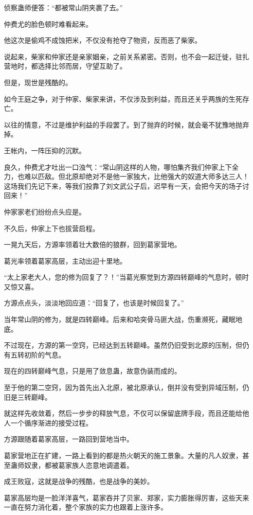 \begin{this_body}
侦察蛊师便答：“都被常山阴夹裹了去。”

仲费尤的脸色顿时难看起来。

他这次是偷鸡不成蚀把米，不仅没有抢夺了物资，反而恶了柴家。

说起来，柴家和仲家还是亲家姻亲，之前关系紧密。否则，也不会一起迁徙，驻扎营地时，都选择比邻而居，守望互助了。

但是，现世是残酷的。

如今王庭之争，对于仲家、柴家来讲，不仅涉及到利益，而且还关乎两族的生死存亡。

以往的情意，不过是维护利益的手段罢了。到了抛弃的时候，就会毫不犹豫地抛弃掉。

王帐内，一阵压抑的沉默。

良久，仲费尤才吐出一口浊气：“常山阴这样的人物，哪怕集齐我们仲家上下全力，也难以匹敌。但北原却绝对不是他一家独大，比他强大的奴道大师多达三人！这场我们先记下来，等我们投靠了刘文武公子后，迟早有一天，会把今天的场子讨回来！”

仲家家老们纷纷点头应是。

不久后，仲家上下也拔营启程。

一晃九天后，方源率领着壮大数倍的狼群，回到葛家营地。

葛光率领着葛家高层，主动出迎十里地。

“太上家老大人，您的修为回复了？！”当葛光察觉到方源四转巅峰的气息时，顿时又惊又喜。

方源点点头，淡淡地回应道：“回复了，也该是时候回复了。”

当年常山阴的修为，就是四转巅峰。后来和哈突骨马匪大战，伤重濒死，藏眠地底。

不过现在，方源的第一空窍，已经达到五转巅峰。虽然仍旧受到北原的压制，但仍有五转初阶的气息。

现在的四转巅峰气息，只是用了敛息蛊，故意伪装而成的。

至于他的第二空窍，因为首先出入北原，被北原承认，倒并没有受到异域压制，仍旧是三转巅峰。

就这样先收敛着，然后一步步的释放气息，不仅可以保留底牌手段，而且还能给他人一个循序渐进的接受过程。

方源跟随着葛家高层，一路回到营地当中。

葛家营地正在扩建，一路上看到的都是热火朝天的施工景象。大量的凡人奴隶，甚至蛊师奴隶，都被葛家族人恣意地调遣着。

成王败寇，这就是战争的残酷，也是战争的美妙。

葛家高层均是一脸洋洋喜气，葛家吞并了贝家、郑家，实力膨胀得厉害，这些天来一直在努力消化着，整个家族的实力也跟着上涨许多。


\end{this_body}
